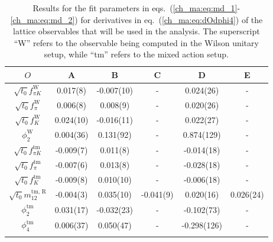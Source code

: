 \newpage

\begin{longtable}{c | c c c c c}
\label{ch_ma:tab:md}
    ${O}$ & A & B & C & D & E \\
    \toprule
    $\sqrt{t_0}f_{\pi K}^{\textrm{W}}$ & 0.017(8) & -0.007(10) & - & 0.024(26) & - \\ 
    $\sqrt{t_0}f_{\pi}^{\textrm{W}}$ & 0.006(8) & 0.008(9) & - & 0.020(26) & - \\ 
    $\sqrt{t_0}f_{K}^{\textrm{W}}$ & 0.024(10) & -0.016(11) & - & 0.022(27) & - \\ 
    $\phi_2^{\textrm{W}}$ & 0.004(36) & 0.131(92) & - & 0.874(129) & - \\ 
    \midrule
    $\sqrt{t_0}f_{\pi K}^{\textrm{tm}}$ & -0.009(7) & 0.011(8) & - & -0.014(18) & - \\ 
    $\sqrt{t_0}f_{\pi}^{\textrm{tm}}$ & -0.007(6) & 0.013(8) & - & -0.028(18) & - \\ 
    $\sqrt{t_0}f_{K}^{\textrm{tm}}$ & -0.009(8) & 0.010(10) & - & -0.006(18) & - \\ 
    $\sqrt{t_0}m_{12}^{\textrm{tm, R}}$ & -0.004(3) & 0.035(10) & -0.041(9) & 0.020(16) & 0.026(24) \\ 
    $\phi_2^{\textrm{tm}}$ & 0.031(17) & -0.032(23) & - & -0.102(73) & - \\ 
    $\phi_4^{\textrm{tm}}$ & 0.006(37) & 0.050(47) & - & -0.298(126) & - \\ 
    \bottomrule
    \caption{Results for the fit parameters in eqs.~(\ref{ch_ma:eq:md_1}-\ref{ch_ma:eq:md_2}) for derivatives in eq.~(\ref{ch_ma:eq:dOdphi4}) of the lattice observables that will be used in the analysis. The superscript ``W'' refers to the observable being computed in the Wilson unitary setup, while ``tm'' refers to the mixed action setup.}
\end{longtable}

